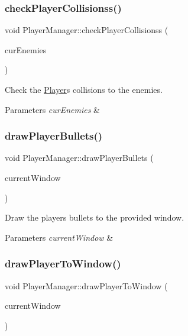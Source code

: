 \subsubsection{\texorpdfstring{check\+Player\+Collisionss()}{checkPlayerCollisionss()}}
{\footnotesize\ttfamily void Player\+Manager\+::check\+Player\+Collisionss (\begin{DoxyParamCaption}\item[{std\+::vector$<$ \hyperlink{class_enemy}{Enemy} $>$ \&}]{cur\+Enemies }\end{DoxyParamCaption})}



Check the \hyperlink{class_player}{Player}\textquotesingle{}s collisions to the enemies. 


\begin{DoxyParams}{Parameters}
{\em cur\+Enemies} & \\
\hline
\end{DoxyParams}
\mbox{\label{class_player_manager_a503d878624b53851c6fa25559630f544}} 
\subsubsection{\texorpdfstring{draw\+Player\+Bullets()}{drawPlayerBullets()}}
{\footnotesize\ttfamily void Player\+Manager\+::draw\+Player\+Bullets (\begin{DoxyParamCaption}\item[{sf\+::\+Render\+Window $\ast$}]{current\+Window }\end{DoxyParamCaption})}



Draw the player\textquotesingle{}s bullets to the provided window. 


\begin{DoxyParams}{Parameters}
{\em current\+Window} & \\
\hline
\end{DoxyParams}
\mbox{\label{class_player_manager_a8dfbc91721f7c9cfeae80ae7fa89602e}} 
\subsubsection{\texorpdfstring{draw\+Player\+To\+Window()}{drawPlayerToWindow()}}
{\footnotesize\ttfamily void Player\+Manager\+::draw\+Player\+To\+Window (\begin{DoxyParamCaption}\item[{sf\+::\+Render\+Window $\ast$}]{current\+Window }\end{DoxyParamCaption})}



